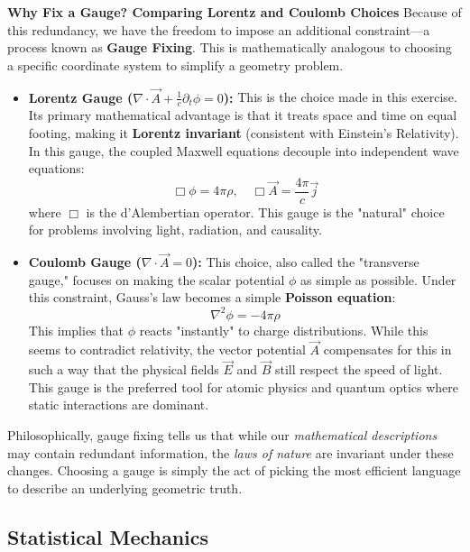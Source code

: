 \textbf{Why Fix a Gauge? Comparing Lorentz and Coulomb Choices}
Because of this redundancy, we have the freedom to impose an additional constraint—a process known as \textbf{Gauge Fixing}. This is mathematically analogous to choosing a specific coordinate system to simplify a geometry problem.

\begin{itemize}
    \item \textbf{Lorentz Gauge ($\nabla \cdot \vec{A} + \frac{1}{c} \partial_t \phi = 0$):} This is the choice made in this exercise. Its primary mathematical advantage is that it treats space and time on equal footing, making it \textbf{Lorentz invariant} (consistent with Einstein's Relativity). In this gauge, the coupled Maxwell equations decouple into independent wave equations:
    \begin{equation*}
        \Box \phi = 4\pi\rho, \quad \Box \vec{A} = \frac{4\pi}{c}\vec{j}
    \end{equation*}
    where $\Box$ is the d'Alembertian operator. This gauge is the "natural" choice for problems involving light, radiation, and causality.

    \item \textbf{Coulomb Gauge ($\nabla \cdot \vec{A} = 0$):} This choice, also called the "transverse gauge," focuses on making the scalar potential $\phi$ as simple as possible. Under this constraint, Gauss's law becomes a simple \textbf{Poisson equation}:
    \begin{equation*}
        \nabla^2 \phi = -4\pi\rho
    \end{equation*}
    This implies that $\phi$ reacts "instantly" to charge distributions. While this seems to contradict relativity, the vector potential $\vec{A}$ compensates for this in such a way that the physical fields $\vec{E}$ and $\vec{B}$ still respect the speed of light. This gauge is the preferred tool for atomic physics and quantum optics where static interactions are dominant.
\end{itemize}

Philosophically, gauge fixing tells us that while our \textit{mathematical descriptions} may contain redundant information, the \textit{laws of nature} are invariant under these changes. Choosing a gauge is simply the act of picking the most efficient language to describe an underlying geometric truth.

\subsection{Statistical Mechanics}

